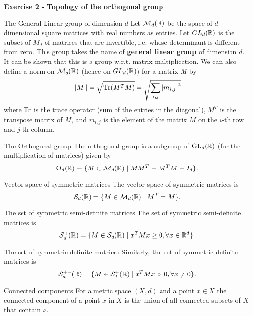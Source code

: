 \documentclass[12pt,a4paper]{article}
\begin{document}
\newpage
\noindent\textbf{Exercise 2 - Topology of the orthogonal group}\\
\begin{Definition}{The General Linear group of dimension $d$}{}
	Let $\mathcal M_d(\mathbb{R})$ be the space of $d$-dimensional square matrices with real numbers as entries. Let $GL_d(\mathbb{R})$ is the subset of $M_d$ of matrices that are invertible, i.e. whose determinant is different from zero. This group takes the name of \textbf{general linear group} of dimension $d$. It can be shown that this is a group w.r.t. matrix multiplication. We can also define a norm on $\mathcal M_d(\mathbb{R})$ (hence on $GL_d(\mathbb{R})$) for a matrix $M$ by
	$$\left\Vert M\right\Vert=\sqrt{\operatorname{Tr}(M^T M)}=\sqrt{\sum_{i,j} \left\vert m_{i,j}\right\vert^2}$$
	where $\operatorname{Tr}$ is the trace operator (sum of the entries in the diagonal), $M^T$ is the transpose matrix of $M$, and $m_{i,j}$ is the element of the matrix $M$ on the $i$-th row and $j$-th column.
\end{Definition}
\begin{Definition}{The Orthogonal group}{}
	The orthogonal group is a subgroup of $\operatorname{GL}_d(\mathbb{R})$ (for the multiplication of matrices) given by
	$$\operatorname{O}_d(\mathbb{R})=\{M\in \mathcal{M}_d(\mathbb{R}) \;|\; M M^T=M^T M=I_d\}.$$
\end{Definition}
\begin{Definition}{Vector space of symmetric matrices}{}
	The vector space of symmetric matrices is
	$$\mathcal{S}_d(\mathbb{R})=\{M\in \mathcal{M}_d(\mathbb{R})\;|\; M^T=M\}.$$
\end{Definition}
\begin{Definition}{The set of symmetric semi-definite matrices}{}
	The set of symmetric semi-definite matrices is
	$$\mathcal{S}_d^+(\mathbb{R})=\{M\in \mathcal{S}_d(\mathbb{R})\;|\; x^TMx\geq 0, \forall x\in \mathbb{R}^d\}.$$
\end{Definition}
\begin{Definition}{The set of symmetric definite matrices}{}
	Similarly, the set of symmetric definite matrices is
	$$\mathcal{S}_d^{++}(\mathbb{R})=\{M\in \mathcal{S}_d^+(\mathbb{R})\;|\; x^TMx> 0, \forall x\neq 0\}.$$
\end{Definition}
\begin{Definition}{Connected components}{}
	For a metric space $(X,d)$ and a point $x\in X$ the connected component of a point $x$ in $X$ is the union of all connected subsets of $X$ that contain $x$. 
\end{Definition}
\end{document}
